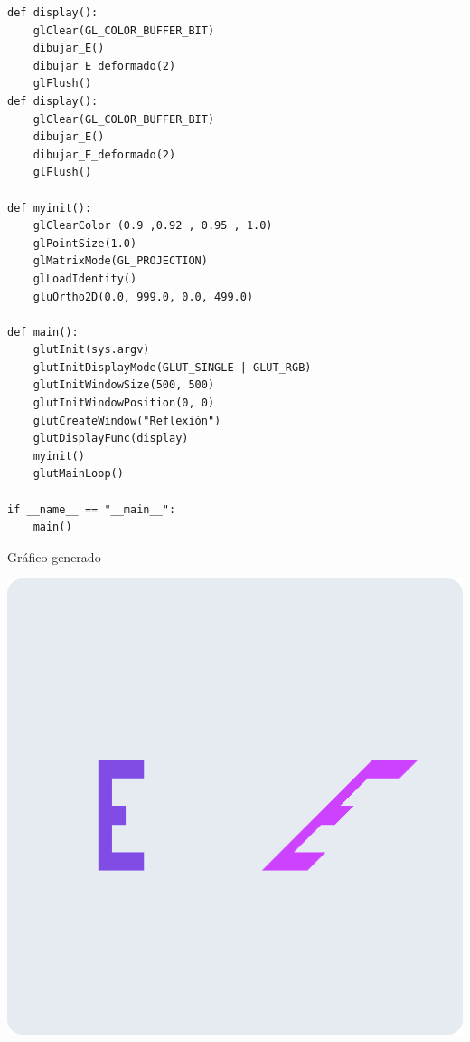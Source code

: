 \documentclass[a4paper]{article}
\begin{document}
\begin{center}
\begin{mycodeboxl}
\begin{lstlisting}
def display():
    glClear(GL_COLOR_BUFFER_BIT) 
    dibujar_E()
    dibujar_E_deformado(2)
    glFlush() 
def display():
    glClear(GL_COLOR_BUFFER_BIT) 
    dibujar_E()
    dibujar_E_deformado(2)
    glFlush() 
 
def myinit():
    glClearColor (0.9 ,0.92 , 0.95 , 1.0)
    glPointSize(1.0)
    glMatrixMode(GL_PROJECTION)
    glLoadIdentity()
    gluOrtho2D(0.0, 999.0, 0.0, 499.0)
 
def main():
    glutInit(sys.argv)
    glutInitDisplayMode(GLUT_SINGLE | GLUT_RGB)
    glutInitWindowSize(500, 500)
    glutInitWindowPosition(0, 0)
    glutCreateWindow("Reflexión") 
    glutDisplayFunc(display)
    myinit()
    glutMainLoop()
 
if __name__ == "__main__":
    main()
\end{lstlisting}
\end{mycodeboxl}
\end{center}
\newpage
Gráfico generado\\
\begin{center}
\includegraphics[width=16cm]{src/3.png}
\end{center}
\newpage
\end{document}
